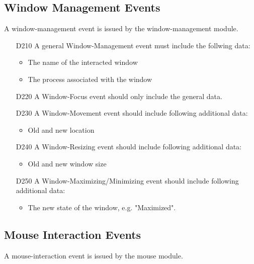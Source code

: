 \subsection{Window Management Events}

A window-management event is issued by the window-management module.

\begin{itemize}
\item[D210] A general Window-Management event must include the follwing data:
	\begin{itemize}
	\item The name of the interacted window
	\item The process associated with the window
	\end{itemize}

\item[D220] A Window-Focus event should only include the general data.

\item[D230] A Window-Movement event should include following additional data:
	\begin{itemize}
	\item Old and new location
	\end{itemize}
	
\item[D240] A Window-Resizing event should include following additional data:
	\begin{itemize}
	\item Old and new window size
	\end{itemize}
	
\item[D250] A Window-Maximizing/Minimizing event should include following additional data:
	\begin{itemize}
	\item The new state of the window, e.g. "Maximized".
	\end{itemize}
\end{itemize}

\subsection{Mouse Interaction Events}

A mouse-interaction event is issued by the mouse module.

